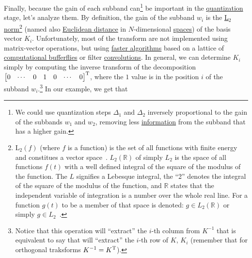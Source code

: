 Finally, because the gain of each subband can\footnote{We could use
  quantization steps $\Delta_1$ and $\Delta_2$ inversely proportional
  to the gain of the subbands $w_1$ and $w_2$, removing less
  \href{https://en.wikipedia.org/wiki/Information}{information} from
  the subband that has a higher gain.} be important in the
\href{https://en.wikipedia.org/wiki/Quantization_(signal_processing)}{quantization}
stage, let's analyze them. By definition, the gain of the subband
$w_i$ is the \href{https://en.wikipedia.org/wiki/Lp_space}{L$_2$
  norm}\footnote{L$_2(f)$ (where $f$ is a function) is the set of all
  functions with finite energy and constitues a vector
  space~\cite{sayood2017introduction}. $L_2({\mathbb R})$ of simply
  $L_2$ is the space of all functions $f(t)$ with a well defined
  integral of the square of the modulus of the function. The $L$
  signifies a Lebesque integral, the ``2'' denotes the integral of the
  square of the modulus of the function, and ${\mathbb R}$ states that
  the independent variable of integration is a number over the whole
  real line. For a function $g(t)$ to be a member of that space is
  denoted: $g\in L_2({\mathbb R})$ or simply
  $g\in L_2$~\cite{burrus2013wavelets}.}  (named also
\href{https://en.wikipedia.org/wiki/Euclidean_distance}{Euclidean
  distance} in $N$-dimensional
\href{https://en.wikipedia.org/wiki/Vector_space}{spaces}) of the
basis vector $K_i$. Unfortunately, most of the transform are not
implemented using matrix-vector operations, but using
\href{https://en.wikipedia.org/wiki/Fast_Fourier_transform}{faster
  algorithms} based on a lattice of
\href{https://en.wikipedia.org/wiki/Butterfly_diagram}{computational
  bufferflies} or filter
\href{https://en.wikipedia.org/wiki/Filter_(signal_processing)}{convolutions}. In
general, we can determine $K_i$ simply by computing the inverse
transform of the decomposition
$\begin{bmatrix} 0 & \cdots & 0 & 1 & 0 & \cdots &
  0 \end{bmatrix}^{\text T}$, where the $1$ value is in the position
$i$ of the subband $w_i$.\footnote{Notice that this operation will
  ``extract'' the $i$-th column from $K^{-1}$ that is equivalent to
  say that will ``extract'' the $i$-th row of $K$, $K_i$ (remember
  that for orthogonal traksforms $K^{-1}=K^{\text T}$).} In our
example, we get that

